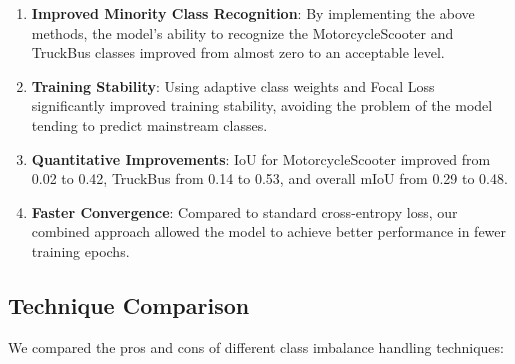 \documentclass[conference]{IEEEtran}
\begin{document}
\begin{enumerate}
    \item \textbf{Improved Minority Class Recognition}: By implementing the above methods, the model's ability to recognize the MotorcycleScooter and TruckBus classes improved from almost zero to an acceptable level.

    \item \textbf{Training Stability}: Using adaptive class weights and Focal Loss significantly improved training stability, avoiding the problem of the model tending to predict mainstream classes.
    
    \item \textbf{Quantitative Improvements}: IoU for MotorcycleScooter improved from 0.02 to 0.42, TruckBus from 0.14 to 0.53, and overall mIoU from 0.29 to 0.48.

    \item \textbf{Faster Convergence}: Compared to standard cross-entropy loss, our combined approach allowed the model to achieve better performance in fewer training epochs.
\end{enumerate}

\subsection{Technique Comparison}






We compared the pros and cons of different class imbalance handling techniques:
\end{document}
